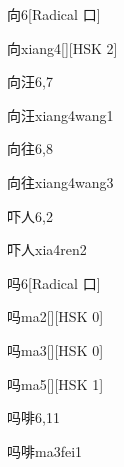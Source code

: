 \begin{entry}{向}{6}[Radical 口]
  \begin{phonetics}{向}{xiang4}[][HSK 2]
  \end{phonetics}
\end{entry}

\begin{entry}{向汪}{6,7}
  \begin{phonetics}{向汪}{xiang4wang1}
  \end{phonetics}
\end{entry}

\begin{entry}{向往}{6,8}
  \begin{phonetics}{向往}{xiang4wang3}
  \end{phonetics}
\end{entry}

\begin{entry}{吓人}{6,2}
  \begin{phonetics}{吓人}{xia4ren2}
  \end{phonetics}
\end{entry}

\begin{entry}{吗}{6}[Radical 口]
  \begin{phonetics}{吗}{ma2}[][HSK 0]
  \end{phonetics}
  \begin{phonetics}{吗}{ma3}[][HSK 0]
  \end{phonetics}
  \begin{phonetics}{吗}{ma5}[][HSK 1]
  \end{phonetics}
\end{entry}

\begin{entry*}{吗啡}{6,11}
  \begin{phonetics}{吗啡}{ma3fei1}
  \end{phonetics}
\end{entry*}

